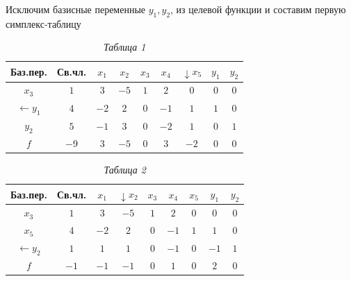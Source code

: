 Исключим базисные переменные $y_{1}, y_{2}$, из целевой функции и составим первую симплекс-таблицу

\begin{table}[h]
\label{table_1_3}
\caption*{\hspace{0.8\linewidth} \textit{Таблица 1}}
\begin{center}
\renewcommand{\tabcolsep}{4mm}
\begin{tabular}{ | c | c | c | c | c | c | c | c | c | }
\hline
Баз.пер. & Св.чл. & $x_{1}$ & $x_{2}$ & $x_{3}$ & $x_{4}$ & $\downarrow x_{5}$ & $y_{1}$ & $y_{2}$\\ \hline
$x_{3}$ & $1$ & $3$ & $-5$ & $1$ & $2$ & $0$ & $0$ & $0$\\ \hline
$\leftarrow y_{1}$ & $4$ & $-2$ & $2$ & $0$ & $-1$ & \cellcolor{Gray}$1$ & $1$ & $0$\\ \hline
$y_{2}$ & $5$ & $-1$ & $3$ & $0$ & $-2$ & $1$ & $0$ & $1$\\ \hline
$f$ & $-9$ & $3$ & $-5$ & $0$ & $3$ & $-2$ & $0$ & $0$ \\ \hline
\end{tabular}
\end{center}
\end{table}

\begin{table}[h]
\label{table_1_4}
\caption*{\hspace{0.8\linewidth} \textit{Таблица 2}}
\begin{center}
\begin{tabular}{ | c | c | c | c | c | c | c | c | c | }
\hline
Баз.пер. & Св.чл. & $x_{1}$ & $\downarrow x_{2}$ & $x_{3}$ & $x_{4}$ & $x_{5}$ & $y_{1}$ & $y_{2}$\\ \hline
$x_{3}$ & $1$ & $3$ & $-5$ & $1$ & $2$ & $0$ & $0$ & $0$\\ \hline
$x_{5}$ & $4$ & $-2$ & $2$ & $0$ & $-1$ & $1$ & $1$ & $0$\\ \hline
$\leftarrow y_{2}$ & $1$ & $1$ & \cellcolor{Gray}$1$ & $0$ & $-1$ & $0$ & $-1$ & $1$\\ \hline
$f$ & $-1$ & $-1$ & $-1$ & $0$ & $1$ & $0$ & $2$ & $0$ \\ \hline
\end{tabular}
\end{center}
\end{table}

